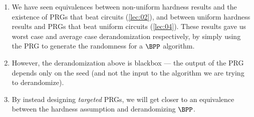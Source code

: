 \begin{enumerate}
  \item We have seen equivalences between non-uniform hardness results and the
    existence of PRGs that beat circuits (\cref{lec:02}), and between uniform
    hardness results and PRGs that beat uniform circuits (\cref{lec:04}).
    These results gave us worst case and average case derandomization
    respectively, by simply using the PRG to generate the randomness for a
    $\BPP$ algorithm.
  \item However, the derandomization above is blackbox --- the output of the
    PRG depends only on the seed (and not the input to the algorithm we are
    trying to derandomize).
  \item By instead designing \emph{targeted} PRGs, we will get closer to an
    equivalence between the hardness assumption and derandomizing $\BPP$.
\end{enumerate}
